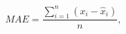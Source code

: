 \begin{equation}
MAE = \frac{\sum _{i=1}^{n} (x_{i}-\widehat{x}_{i})}{n} ,
\label{eq:meanAbsoluteError}
\end{equation}